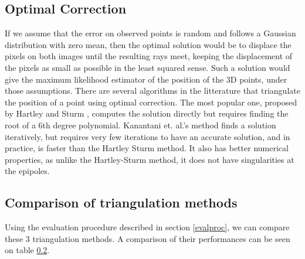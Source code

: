 \subsection{Optimal Correction}
If we assume that the error on observed points is random and follows a Gaussian distribution with zero mean, then the optimal solution would be to displace the pixels on both images until the resulting rays meet, keeping the displacement of the pixels as small as possible in the least squared sense. Such a solution would give the maximum likelihood estimator of the position of the 3D points, under those assumptions.
There are several algorithms in the litterature that triangulate the position of a point using optimal correction. The most popular one, proposed by Hartley and Sturm \cite{hartleysturm}, computes the solution directly but requires finding the root of a 6th degree polynomial. Kanantani et. al.'s method \cite{kanatani} finds a solution iteratively, but requires very few iterations to have an accurate solution, and in practice, is faster than the Hartley Sturm method. It also has better numerical properties, as unlike the Hartley-Sturm method, it does not have singularities at the epipoles.

\subsection{Comparison of triangulation methods}
Using the evaluation procedure described in section \ref{evalproc}, we can compare these 3 triangulation methods. A comparison of their performances can be seen on table \ref{}.



